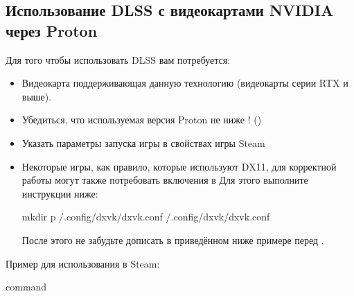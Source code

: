 \documentclass[letterpaper,10pt,russian,openany]{sphinxmanual}
\begin{document}
\subsection{Использование DLSS с видеокартами NVIDIA через Proton}
\label{\detokenize{source/linux-gaming:dlss-nvidia-proton}}\label{\detokenize{source/linux-gaming:nvidia-dlss-with-proton}}\label{\detokenize{source/linux-gaming:index-18}}
\sphinxAtStartPar
Для того чтобы использовать DLSS вам потребуется:
\begin{itemize}
\item {} 
\sphinxAtStartPar
Видеокарта поддерживающая данную технологию (видеокарты серии RTX и выше).

\item {} 
\sphinxAtStartPar
Убедиться, что используемая версия Proton не ниже ! ()

\item {} 
\sphinxAtStartPar
Указать параметры запуска игры в свойствах игры Steam 

\item {} 
\sphinxAtStartPar
Некоторые игры, как правило, которые используют DX11, для корректной работы могут также потребовать включения  в 
Для этого выполните инструкции ниже:

\begin{sphinxVerbatim}[commandchars=\\\{\}]
mkdir \PYGZhy{}p \PYGZti{}/.config/dxvk/dxvk.conf
  \PYGZgt{} \PYGZti{}/.config/dxvk/dxvk.conf
\end{sphinxVerbatim}

\sphinxAtStartPar
После этого не забудьте дописать  в приведённом ниже примере перед .

\end{itemize}

\sphinxAtStartPar
Пример для использования в Steam:

\begin{sphinxVerbatim}[commandchars=\\\{\}]
  \PYGZpc{}command\PYGZpc{}
\end{sphinxVerbatim}
\end{document}
